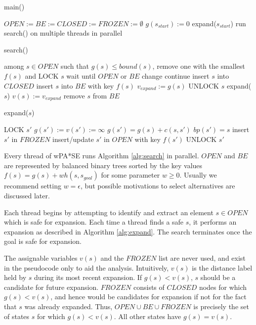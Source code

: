 \documentclass[letterpaper]{article}
\begin{document}
\begin{algorithm}
\caption{main()}
\label{alg:main}
\begin{algorithmic}
\STATE $OPEN := BE := CLOSED := FROZEN := \emptyset$
\STATE $g(s_{start}) := 0$
\STATE expand($s_{start}$)
\STATE run search() on multiple threads in parallel
\end{algorithmic}
\end{algorithm}

\begin{algorithm}
\caption{search()}
\label{alg:search}
\begin{algorithmic}
\STATE among $s\in OPEN$ such that $g(s) \le bound(s)$, remove one with the smallest $f(s)$ and LOCK $s$
\STATE wait until $OPEN$ or $BE$ change
\STATE continue
\ENDIF
\STATE insert $s$ into $CLOSED$
\STATE insert $s$ into $BE$ with key $f(s)$
\STATE $v_{expand} := g(s)$
\STATE UNLOCK $s$
\STATE expand($s$)
\STATE $v(s) := v_{expand}$
\STATE remove $s$ from $BE$
\ENDWHILE
\end{algorithmic}
\end{algorithm}

\begin{algorithm}
\caption{expand($s$)}
\label{alg:expand}
\begin{algorithmic}
\STATE LOCK $s'$
\STATE $g(s') := v(s') := \infty$
\ENDIF
{}
\STATE $g(s') = g(s) + c(s,s')$
\STATE $bp(s') = s$
\STATE insert $s'$ in $FROZEN$
\ELSE
\STATE insert/update $s'$ in $OPEN$ with key $f(s')$
\ENDIF
\ENDIF
\STATE UNLOCK $s'$
\ENDFOR
\end{algorithmic}
\end{algorithm}

Every thread of wPA*SE runs Algorithm \ref{alg:search} in parallel. $OPEN$ and $BE$ are represented by balanced binary trees sorted by the key values $f(s) = g(s) + wh(s,s_{goal})$ for some parameter $w\ge 0$. Usually we recommend setting $w=\epsilon$, but possible motivations to select alternatives are discussed later.

Each thread begins by attempting to identify and extract an element $s\in OPEN$ which is safe for expansion. Each time a thread finds a safe $s$, it performs an expansion as described in Algorithm \ref{alg:expand}. The search terminates once the goal is safe for expansion.

The assignable variables $v(s)$ and the $FROZEN$ list are never used, and exist in the pseudocode only to aid the analysis. Intuitively, $v(s)$ is the distance label held by $s$ during its most recent expansion. If $g(s) < v(s)$, $s$ should be a candidate for future expansion. $FROZEN$ consists of $CLOSED$ nodes for which $g(s) < v(s)$, and hence would be candidates for expansion if not for the fact that $s$ was already expanded. Thus, $OPEN\cup BE\cup FROZEN$ is precisely the set of states $s$ for which $g(s) < v(s)$. All other states have $g(s) = v(s)$.
\end{document}
